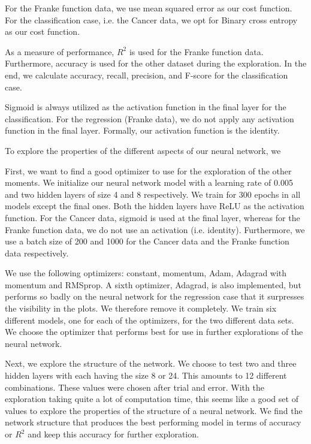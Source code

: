 For the Franke function data, we use mean squared error as our cost function. For the classification case, i.e. the Cancer data, we opt for Binary cross entropy as our cost function.

As a measure of performance, $R^2$ is used for the Franke function data. 
Furthermore, accuracy is used for the other dataset during the exploration. 
In the end, we calculate accuracy, recall, precision, and F-score for the classification case. 

Sigmoid is always utilized as the activation function in the final layer for the classification. 
For the regression (Franke data), we do not apply any activation function in the final layer.
Formally, our activation function is the identity.

To explore the properties of the different aspects of our neural network, we 

First, we want to find a good optimizer to use for the exploration of the other moments. 
We initialize our neural network model with a learning rate of 0.005 and two hidden layers of size 4 and 8 respectively. We train for 300 epochs in all models except the final ones. 
Both the hidden layers have ReLU as the activation function. 
For the Cancer data, sigmoid is used at the final layer, whereas for the Franke function data, we do not use an activation (i.e. identity). 
Furthermore, we use a batch size of 200 and 1000 for the Cancer data and the Franke function data respectively. 

We use the following optimizers: constant, momentum, Adam, Adagrad with momentum and RMSprop. 
A sixth optimizer, Adagrad, is also implemented, but performs so badly on the neural network for the regression case that it surpresses the visibility in the plots. 
We therefore remove it completely. 
We train six different models, one for each of the optimizers, for the two different data sets. 
We choose the optimizer that performs best for use in further explorations of the neural network. 

Next, we explore the structure of the network. We choose to test two and three hidden layers with each having the size 8 or 24. 
This amounts to 12 different combinations. 
These values were chosen after trial and error.
With the exploration taking quite a lot of computation time, this seems like a good set of values to explore the properties of the structure of a neural network. 
We find the network structure that produces the best performing model in terms of accuracy or $R^2$ and keep this accuracy for further exploration. 


